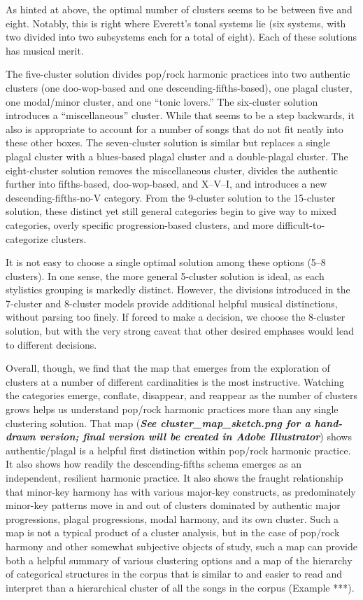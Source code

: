 As hinted at above, the optimal number of clusters seems to be between five and eight. Notably, this is right where Everett's tonal systems lie (six systems, with two divided into two subsystems each for a total of eight). Each of these solutions has musical merit.

The five-cluster solution divides pop\slash rock harmonic practices into two authentic clusters (one doo-wop-based and one descending-fifths-based), one plagal cluster, one modal\slash minor cluster, and one ``tonic lovers.'' The six-cluster solution introduces a ``miscellaneous'' cluster. While that seems to be a step backwards, it also is appropriate to account for a number of songs that do not fit neatly into these other boxes. The seven-cluster solution is similar but replaces a single plagal cluster with a blues-based plagal cluster and a double-plagal cluster. The eight-cluster solution removes the miscellaneous cluster, divides the authentic further into fifths-based, doo-wop-based, and X–V–I, and introduces a new descending-fifths-no-V category. From the 9-cluster solution to the 15-cluster solution, these distinct yet still general categories begin to give way to mixed categories, overly specific progression-based clusters, and more difficult-to-categorize clusters.

It is not easy to choose a single optimal solution among these options (5–8 clusters). In one sense, the more general 5-cluster solution is ideal, as each stylistics grouping is markedly distinct. However, the divisions introduced in the 7-cluster and 8-cluster models provide additional helpful musical distinctions, without parsing too finely. If forced to make a decision, we choose the 8-cluster solution, but with the very strong caveat that other desired emphases would lead to different decisions.

Overall, though, we find that the map that emerges from the exploration of clusters at a number of different cardinalities is the most instructive. Watching the categories emerge, conflate, disappear, and reappear as the number of clusters grows helps us understand pop\slash rock harmonic practices more than any single clustering solution. That map (\textbf{\emph{See cluster\_map\_sketch.png for a hand-drawn version; final version will be created in Adobe Illustrator}}) shows authentic\slash plagal is a helpful first distinction within pop\slash rock harmonic practice. It also shows how readily the descending-fifths schema emerges as an independent, resilient harmonic practice. It also shows the fraught relationship that minor-key harmony has with various major-key constructs, as predominately minor-key patterns move in and out of clusters dominated by authentic major progressions, plagal progressions, modal harmony, and its own cluster. Such a map is not a typical product of a cluster analysis, but in the case of pop\slash rock harmony and other somewhat subjective objects of study, such a map can provide both a helpful summary of various clustering options and a map of the hierarchy of categorical structures in the corpus that is similar to and easier to read and interpret than a hierarchical cluster of all the songs in the corpus (Example ***).

